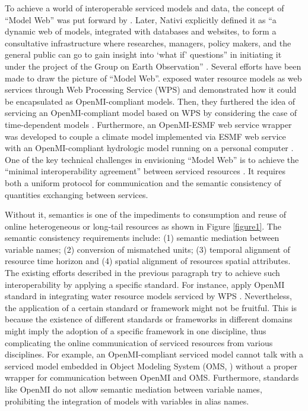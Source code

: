 \documentclass[review]{elsarticle}
\begin{document}
To achieve a world of interoperable serviced models and data, the concept of “Model Web” was put forward by \citep{geller2008}. Later, Nativi explicitly defined it as “a dynamic web of models, integrated with databases and websites, to form a consultative infrastructure where researches, managers, policy makers, and the general public can go to gain insight into ‘what if’ questions” in initiating it under the project of the Group on Earth Observation” \citep{nativi2013}. Several efforts have been made to draw the picture of “Model Web”. \citet{goodall2011} exposed water resource models as web services through Web Processing Service (WPS) and demonstrated how it could be encapsulated as OpenMI-compliant models. Then, they furthered the idea of servicing an OpenMI-compliant model based on WPS by considering the case of time-dependent models \citep{castronova2013}. Furthermore, an OpenMI-ESMF web service wrapper was developed to couple a climate model implemented via ESMF web service with an OpenMI-compliant hydrologic model running on a personal computer \citep{goodall2013}.\\
One of the key technical challenges in envisioning “Model Web” is to achieve the “minimal interoperability agreement” between serviced resources \citep{nativi2013}. It requires both a uniform protocol for communication and the semantic consistency of quantities exchanging between services.

Without it, semantics is one of the impediments to consumption and reuse of online heterogeneous or long-tail resources \citep{elag2015} as shown in Figure \ref{figure1}. The semantic consistency requirements include: (1) semantic mediation between variable names; (2) conversion of mismatched units; (3) temporal alignment of resource time horizon and (4) spatial alignment of resources spatial attributes. The existing efforts described in the previous paragraph try to achieve such interoperability by applying a specific standard. For instance, apply OpenMI standard in integrating water resource models serviced by WPS \citep{goodall2011, castronova2013}. Nevertheless, the application of a certain standard or framework might not be fruitful. This is because the existence of different standards or frameworks in different domains might imply the adoption of a specific framework in one discipline, thus complicating the online communication of serviced resources from various disciplines. For example, an OpenMI-compliant serviced model cannot talk with a serviced model embedded in Object Modeling System (OMS, \cite{david2013}) without a proper wrapper for communication between OpenMI and OMS. Furthermore, standards like OpenMI do not allow semantic mediation between variable names, prohibiting the integration of models with variables in alias names.
\end{document}
